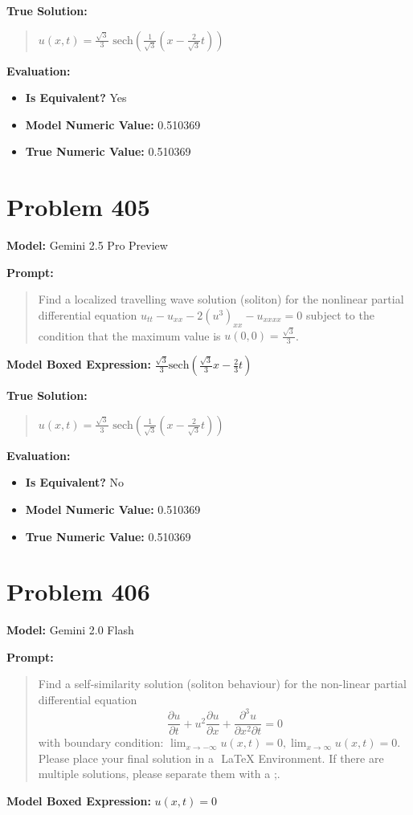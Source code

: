 \documentclass{article}
\begin{document}
\textbf{True Solution:}
\begin{quote}
$u(x,t) = \frac{\sqrt{3}}{3} \text{ sech}(\frac{1}{\sqrt{3}} (x - \frac{2}{\sqrt{3}}t))$
\end{quote}

\textbf{Evaluation:}
\begin{itemize}
\item \textbf{Is Equivalent?} Yes
\item \textbf{Model Numeric Value:} 0.510369
\item \textbf{True Numeric Value:} 0.510369
\end{itemize}
\vspace{1cm}
\section*{Problem 405}
\textbf{Model:} Gemini 2.5 Pro Preview

\textbf{Prompt:}
\begin{quote}
Find a localized travelling wave solution (soliton) for the nonlinear partial differential equation $u_{tt} - u_{xx} - 2 (u^3)_{xx} - u_{xxxx}=0$ subject to the condition that the maximum value is $u(0,0) = \frac{\sqrt{3}}{3}$.
\end{quote}
\textbf{Model Boxed Expression:} $\frac{\sqrt{3}}{3} \text{sech}\left(\frac{\sqrt{3}}{3}x - \frac{2}{3}t\right)$

\textbf{True Solution:}
\begin{quote}
$u(x,t) = \frac{\sqrt{3}}{3} \text{ sech}(\frac{1}{\sqrt{3}} (x - \frac{2}{\sqrt{3}}t))$
\end{quote}

\textbf{Evaluation:}
\begin{itemize}
\item \textbf{Is Equivalent?} No
\item \textbf{Model Numeric Value:} 0.510369
\item \textbf{True Numeric Value:} 0.510369
\end{itemize}
\vspace{1cm}
\section*{Problem 406}
\textbf{Model:} Gemini 2.0 Flash

\textbf{Prompt:}
\begin{quote}
Find a self-similarity solution (soliton behaviour) for the non-linear partial differential equation $$\frac{\partial u}{\partial t} + u^2 \frac{\partial u}{\partial x} + \frac{\partial^3 u}{\partial x^2 \partial t} = 0$$ with boundary condition: $\lim_{x \to -\infty} u(x,t) = 0,\lim_{x \to \infty} u(x,t) = 0$. Please place your final solution in a $\boxed{}$ LaTeX Environment. If there are multiple solutions, please separate them with a ;.
\end{quote}
\textbf{Model Boxed Expression:} $u(x,t) = 0$
\end{document}
